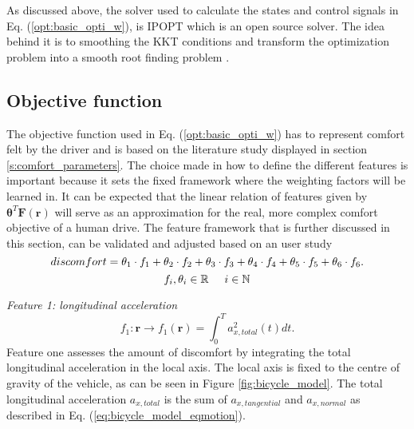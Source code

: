As discussed above, the solver used to calculate the states and control signals in Eq. (\ref{opt:basic_opti_w}), is IPOPT which is an open source solver. The idea behind it is to smoothing the KKT conditions and transform the optimization problem into a smooth root finding problem \cite{Panos_opti}. \\


\subsection{Objective function}\label{s:obj}
The objective function used in Eq. (\ref{opt:basic_opti_w}) has to represent comfort felt by the driver and is based on the literature study displayed in section \ref{s:comfort_parameters}. The choice made in how to define the different features is important because it sets the fixed framework where the weighting factors will be learned in. It can be expected that the linear relation of features given by $\bm{\theta}^T\bm{F}(\bm{r})$ will serve as an approximation for the real, more complex comfort objective of a human drive. The feature framework that is further discussed in this section, can be validated and adjusted based on an user study\\


\begin{equation}\label{eq:obj}
discomfort = \theta_1 \cdot f_1 +\theta_2 \cdot f_2 +\theta_3 \cdot f_3 +\theta_4 \cdot f_4 +\theta_5 \cdot f_5 +\theta_6 \cdot f_6 .\\
\end{equation}
\[	f_i, \theta_i \in \mathbb{R} \hspace{5mm}
i \in \mathbb{N}\]


\textit{Feature 1: longitudinal acceleration}
\begin{equation}\label{eq:flong_acc}
f_{1}:\bm{r}\xrightarrow{}f_1(\bm{r})=\int_{0}^{T}a_{x,total}^{2}(t) dt.
\end{equation}
Feature one assesses the amount of discomfort by integrating the total longitudinal acceleration in the local axis. The local axis is fixed to the centre of gravity of the vehicle, as can be seen in Figure \ref{fig:bicycle_model}. The total longitudinal acceleration  $a_{x,total} $ is the sum of  $ a_{x,tangential}$ and $a_{x,normal}$ as described in Eq. (\ref{eq:bicycle_model_eqmotion}). \\

